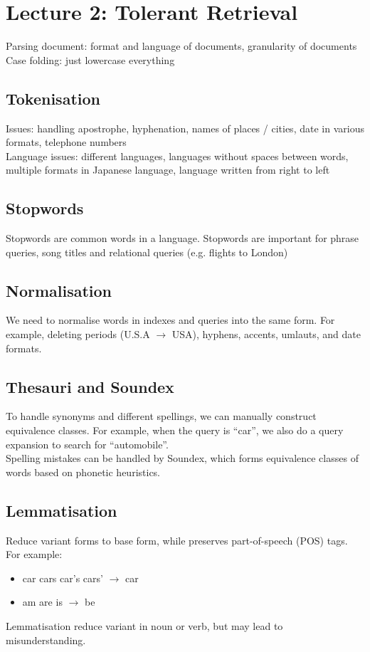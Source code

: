 \chapter{Lecture 2: Tolerant Retrieval}
\begin{multicols*}{2}

\noindent Parsing document: format and language of documents, granularity of documents \\

\noindent Case folding: just lowercase everything

\section{Tokenisation}
\noindent Issues: handling apostrophe, hyphenation, names of places / cities, date in various formats, telephone numbers \\

\noindent Language issues: different languages, languages without spaces between words, multiple formats in Japanese language, language written from right to left

\section{Stopwords}
\noindent Stopwords are common words in a language. Stopwords are important for phrase queries, song titles and relational queries (e.g. flights to London)

\section{Normalisation}
\noindent We need to normalise words in indexes and queries into the same form. For example, deleting periods (U.S.A $\rightarrow$ USA), hyphens, accents, umlauts, and date formats.

\section{Thesauri and Soundex}
\noindent To handle synonyms and different spellings, we can manually construct equivalence classes. For example, when the query is ``car'', we also do a query expansion to search for ``automobile''. \\

\noindent Spelling mistakes can be handled by Soundex, which forms equivalence classes of words based on phonetic heuristics.

\section{Lemmatisation}
Reduce variant forms to base form, while preserves part-of-speech (POS) tags. For example:
\begin{itemize}
    \item car cars car’s cars’ $\rightarrow$ car
    \item am are is $\rightarrow$ be
\end{itemize}
\noindent Lemmatisation reduce variant in noun or verb, but may lead to misunderstanding. 


\end{multicols*}
